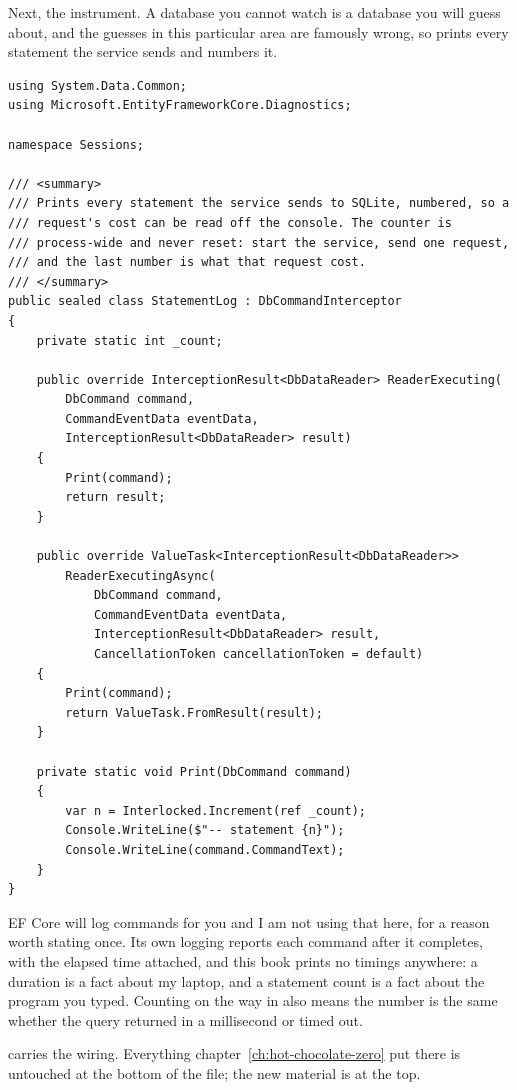 %
%
Next, the instrument. A database you cannot watch is a database you will guess
about, and the guesses in this particular area are famously wrong, so
 prints every statement the service sends and numbers it.

\begin{verbatim}
using System.Data.Common;
using Microsoft.EntityFrameworkCore.Diagnostics;

namespace Sessions;

/// <summary>
/// Prints every statement the service sends to SQLite, numbered, so a
/// request's cost can be read off the console. The counter is
/// process-wide and never reset: start the service, send one request,
/// and the last number is what that request cost.
/// </summary>
public sealed class StatementLog : DbCommandInterceptor
{
    private static int _count;

    public override InterceptionResult<DbDataReader> ReaderExecuting(
        DbCommand command,
        CommandEventData eventData,
        InterceptionResult<DbDataReader> result)
    {
        Print(command);
        return result;
    }

    public override ValueTask<InterceptionResult<DbDataReader>>
        ReaderExecutingAsync(
            DbCommand command,
            CommandEventData eventData,
            InterceptionResult<DbDataReader> result,
            CancellationToken cancellationToken = default)
    {
        Print(command);
        return ValueTask.FromResult(result);
    }

    private static void Print(DbCommand command)
    {
        var n = Interlocked.Increment(ref _count);
        Console.WriteLine($"-- statement {n}");
        Console.WriteLine(command.CommandText);
    }
}
\end{verbatim}

EF Core will log commands for you and I am not using that here, for a reason
worth stating once. Its own logging reports each command after it completes,
with the elapsed time attached, and this book prints no timings anywhere: a
duration is a fact about my laptop, and a statement count is a fact about the
program you typed. Counting on the way in also means the number is the same
whether the query returned in a millisecond or timed out.

%
 carries the wiring. Everything
chapter~\ref{ch:hot-chocolate-zero} put there is untouched at the bottom of the
file; the new material is at the top.

